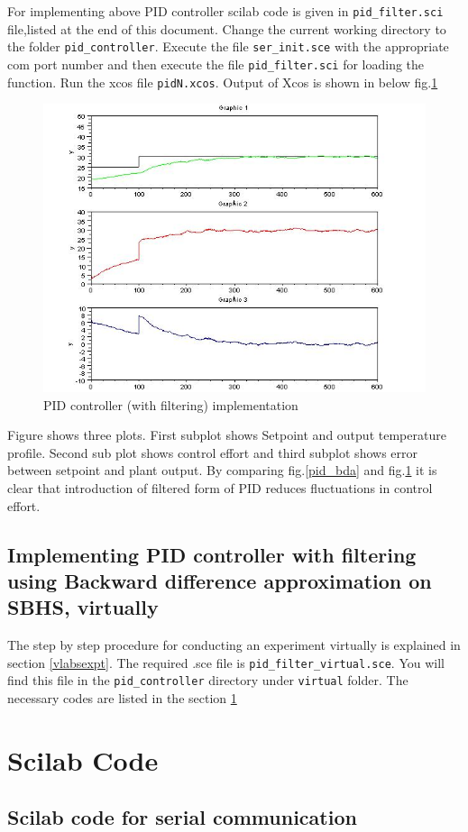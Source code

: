 For implementing above PID controller scilab code is given in {\tt pid\_filter.sci} file,listed at the end of this document. Change the current working directory to the folder {\tt pid\_controller}. Execute the file {\tt ser\_init.sce} with the appropriate com port number and then execute the file {\tt pid\_filter.sci} for loading the function. Run the xcos file {\tt pidN.xcos}. Output of Xcos is shown in below fig.\ref{pid_filter}
\begin{figure}
\centering
\includegraphics[width=0.7\linewidth]{pid_manual/pid_filter.jpg}
\caption{PID controller (with filtering) implementation}
\label{pid_filter}
\end{figure}
 Figure shows three plots. First subplot shows Setpoint and output temperature profile. Second sub plot shows control effort and third subplot shows error between setpoint and plant output.
By comparing fig.\ref{pid_bda} and fig.\ref{pid_filter} it is clear that introduction of filtered form of PID reduces fluctuations in control effort.

\subsection{Implementing PID controller with filtering using Backward difference approximation on SBHS, virtually}
The step by step procedure for conducting an experiment virtually is explained in section \ref{vlabsexpt}. The required .sce file is {\tt pid\_filter\_virtual.sce}.  You will find this file in the {\tt pid\_controller} directory under {\tt virtual} folder. The necessary codes are listed in the section \ref{pidcodes}


\section{Scilab Code}\label{pidcodes}
\subsection{Scilab code for serial communication}
\begin{code}

\end{code}
